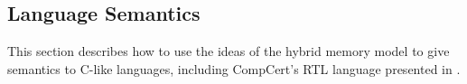 


















\subsection{Language Semantics}
\label{sec:intptrcast:formal-semantics:langsem}

This section describes how to use the ideas of the hybrid memory model to give semantics to C-like
languages, including CompCert's RTL language presented in .


